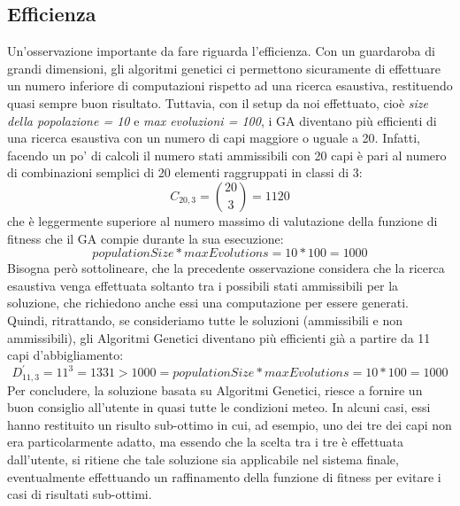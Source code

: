 \documentclass[a4paper, 11pt, oneside]{report}
\begin{document}
            \subsection{Efficienza}\label{subsec:efficienza}
            Un'osservazione importante da fare riguarda l'efficienza.
            Con un guardaroba di grandi dimensioni, gli algoritmi genetici
            ci permettono sicuramente di effettuare un numero inferiore di computazioni rispetto ad una ricerca esaustiva,
            restituendo quasi sempre buon risultato.
            Tuttavia, con il setup da noi effettuato, cioè \emph{size della popolazione = 10} e
            \emph{max evoluzioni = 100}, i GA diventano più efficienti di una ricerca esaustiva con un numero di capi
            maggiore o uguale a 20.
            Infatti, facendo un po' di calcoli il numero stati ammissibili con 20 capi è pari al numero di combinazioni semplici
            di 20 elementi raggruppati in classi di 3:
            \begin{equation*}
                C_{20,3}=\binom{20}{3}= 1120
            \end{equation*}
            che è leggermente superiore al numero massimo di valutazione della funzione di fitness che il GA compie durante la sua esecuzione:
            \begin{equation*}
                populationSize * maxEvolutions = 10 * 100 = 1000
            \end{equation*}
            Bisogna però sottolineare, che la precedente osservazione considera che la ricerca esaustiva venga effettuata soltanto
            tra i possibili stati ammissibili per la soluzione, che richiedono anche essi una computazione per essere generati.
            Quindi, ritrattando, se consideriamo tutte le soluzioni (ammissibili e non ammissibili), gli Algoritmi Genetici diventano più efficienti già a partire da
            11 capi d'abbigliamento:
            \begin{equation*}
                D_{11,3}^{'}=11^3 = 1331  > 1000 = populationSize * maxEvolutions = 10 * 100 = 1000
            \end{equation*}
            Per concludere, la soluzione basata su Algoritmi Genetici, riesce a fornire un buon consiglio all'utente
            in quasi tutte le condizioni meteo.
            In alcuni casi, essi hanno restituito un risulto sub-ottimo in cui, ad esempio, uno dei tre dei capi non era
            particolarmente adatto, ma essendo che la scelta tra i tre è effettuata dall'utente, si ritiene che tale soluzione
            sia applicabile nel sistema finale, eventualmente effettuando un raffinamento della funzione di fitness per
            evitare i casi di risultati sub-ottimi.
\end{document}

